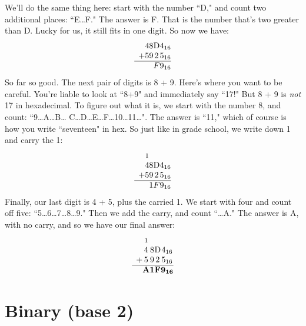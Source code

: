 We'll do the same thing here: start with the number ``D," and count two
additional places: ``E\dots F." The answer is F. That is the number that's
two greater than D. Lucky for us, it still fits in one digit. So now we
have:
\[
\begin{array}{*{5}{c@{\hspace{0pt}}}}
   &        4 &        8 & \text{D} & 4_{16} \\
 + &        5 &        9 &        2 & 5_{16} \\
\hline
   &          &          &        F & 9_{16} \\
\end{array}
\]
So far so good. The next pair of digits is 8 + 9. Here's where you want to
be careful. You're liable to look at ``8+9" and immediately say ``17!" But
8 + 9 is \textit{not} 17 in hexadecimal. To figure out
what it is, we start with the number 8, and count: ``9\dots A\dots B\dots
C\dots D\dots E\dots F\dots 10\dots 11\dots". The answer is ``11," which of
course is how you write ``seventeen" in hex. So just like in grade school,
we write down 1 and carry the 1:
\[
\begin{array}{*{5}{c@{\hspace{0pt}}}}
   &        \text{{\footnotesize 1}}  &          & & \\
   &        4 &        8 & \text{D} & 4_{16} \\
 + &        5 &        9 &        2 & 5_{16} \\
\hline
   &          &        1 &        F & 9_{16} \\
\end{array}
\]
Finally, our last digit is 4 + 5, plus the carried 1. We start with four
and count off five: ``5\dots 6\dots 7\dots 8\dots 9." Then we add the
carry, and count ``\dots A." The answer is A, with no carry, and so we have
our final answer:
\[
\begin{array}{*{5}{c@{\hspace{0pt}}}}
   &        \text{{\footnotesize 1}}  &          & & \\
   &        4 &        8 & \text{D} & 4_{16} \\
 + &        5 &        9 &        2 & 5_{16} \\
\hline
   & \textbf{A} & \textbf{1} & \textbf{F} & \textbf{9}_{\textbf{16}} \\
\end{array}
\]


\section{Binary (base 2)}

